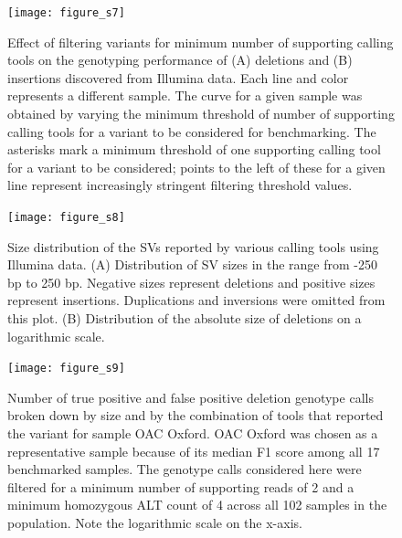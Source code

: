 \documentclass[12pt]{article}
\newenvironment{cfigure}
	{\begin{figure} \centering}
	{\end{figure}}
\newenvironment{lsfigure}
	{\begin{landscape} \begin{figure} \centering}
	{\end{figure} \end{landscape}}
\begin{document}
\begin{cfigure}
	\texttt{[image: figure\_s7]}

	\caption[Effect of the number of supporting calling tools on genotyping performance of Illumina deletions and insertions]{
		Effect of filtering variants for minimum number of supporting calling tools on the genotyping performance of (A) deletions and (B) insertions discovered from Illumina data.
		Each line and color represents a different sample.
		The curve for a given sample was obtained by varying the minimum threshold of number of supporting calling tools for a variant to be considered for benchmarking.
		The asterisks mark a minimum threshold of one supporting calling tool for a variant to be considered; points to the left of these for a given line represent increasingly stringent filtering threshold values.
		}

	\label{fig_s7}

\end{cfigure}

\clearpage%

\begin{cfigure}
	\texttt{[image: figure\_s8]}

	\caption[Size distribution of the SVs reported by various calling tools using Illumina data]{
		Size distribution of the SVs reported by various calling tools using Illumina data.
		(A) Distribution of SV sizes in the range from -250 bp to 250 bp.
		Negative sizes represent deletions and positive sizes represent insertions.
		Duplications and inversions were omitted from this plot.
		(B) Distribution of the absolute size of deletions on a logarithmic scale.
	}

	\label{fig_s8}

\end{cfigure}

\clearpage%

\begin{lsfigure}
	\texttt{[image: figure\_s9]}

	\caption[Number of true positive and false positive deletion calls reported by various calling tool combinations]{
		Number of true positive and false positive deletion genotype calls broken down by size and by the combination of tools that reported the variant for sample OAC Oxford.
		OAC Oxford was chosen as a representative sample because of its median F1 score among all 17 benchmarked samples.
		The genotype calls considered here were filtered for a minimum number of supporting reads of 2 and a minimum homozygous ALT count of 4 across all 102 samples in the population.
		Note the logarithmic scale on the x-axis.
	}

	\label{fig_s9}

\end{lsfigure}
\end{document}

